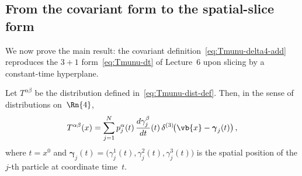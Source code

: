 \subsection{From the covariant form to the spatial-slice form}%
\label{sec:equivalence}

We now prove the main result: the covariant
definition~\eqref{eq:Tmunu-delta4-add} reproduces the $3{+}1$
form~\eqref{eq:Tmunu-dt} of Lecture~6 upon slicing by a
constant-time hyperplane.

\begin{theorem}\label{thm:equivalence}
  Let $T^{\alpha\beta}$ be the distribution defined
  in~\eqref{eq:Tmunu-dist-def}.  Then, in the sense of
  distributions on~$\Rn{4}$,
  \begin{equation}\label{eq:equivalence}
    T^{\alpha\beta}(x) = \sum_{j=1}^{N} p_j^\alpha(t)\,
      \frac{d\gamma_j^\beta}{dt}(t)\,
      \delta^{(3)}\!\bigl(\vb{x} - \boldsymbol{\gamma}_j(t)\bigr)\,,
  \end{equation}
  where $t = x^0$ and $\boldsymbol{\gamma}_j(t) =
  \bigl(\gamma_j^1(t),\gamma_j^2(t),\gamma_j^3(t)\bigr)$ is the
  spatial position of the $j$-th particle at coordinate time~$t$.
\end{theorem}

